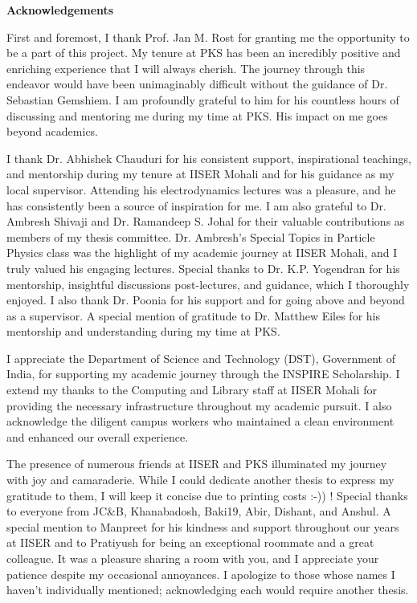 \begin{center}
    {\Large\bfseries\sffamily  Acknowledgements}
\end{center}
    
First and foremost, I thank Prof. Jan M. Rost for granting me the opportunity to be a part of this project. My tenure at PKS has been an incredibly positive and enriching experience that I will always cherish. The journey through this endeavor would have been unimaginably difficult without the guidance of Dr. Sebastian Gemshiem. I am profoundly grateful to him for his countless hours of discussing and mentoring me during my time at PKS. His impact on me goes beyond academics.


I thank Dr. Abhishek Chauduri for his consistent support, inspirational teachings, and mentorship during my tenure at IISER Mohali and for his guidance as my local supervisor. Attending his electrodynamics lectures was a pleasure, and he has consistently been a source of inspiration for me. I am also grateful to Dr. Ambresh Shivaji and Dr. Ramandeep S. Johal for their valuable contributions as members of my thesis committee. Dr. Ambresh's Special Topics in Particle Physics class was the highlight of my academic journey at IISER Mohali, and I truly valued his engaging lectures. Special thanks to Dr. K.P. Yogendran for his mentorship, insightful discussions post-lectures, and guidance, which I thoroughly enjoyed. I also thank Dr. Poonia for his support and for going above and beyond as a supervisor. A special mention of gratitude to Dr. Matthew Eiles for his mentorship and understanding during my time at PKS.

I appreciate the Department of Science and Technology (DST), Government of India, for supporting my academic journey through the INSPIRE Scholarship. I extend my thanks to the Computing and Library staff at IISER Mohali for providing the necessary infrastructure throughout my academic pursuit. I also acknowledge the diligent campus workers who maintained a clean environment and enhanced our overall experience.

The presence of numerous friends at IISER and PKS illuminated my journey with joy and camaraderie. While I could dedicate another thesis to express my gratitude to them, I will keep it concise due to printing costs :-)) ! Special thanks to everyone from JC\&B, Khanabadosh, Baki19, Abir, Dishant, and Anshul. A special mention to Manpreet for his kindness and support throughout our years at IISER and to Pratiyush for being an exceptional roommate and a great colleague. It was a pleasure sharing a room with you, and I appreciate your patience despite my occasional annoyances. I apologize to those whose names I haven't individually mentioned; acknowledging each would require another thesis.

